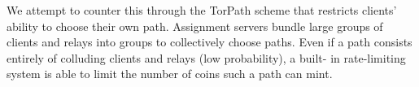 We attempt to counter this through the TorPath scheme that restricts clients'
ability to choose their own path. Assignment servers bundle large groups of
clients and relays into groups to collectively choose paths. Even if a path
consists entirely of colluding clients and relays (low probability), a built-
in rate-limiting system is able to limit the number of coins such a path can
mint.







